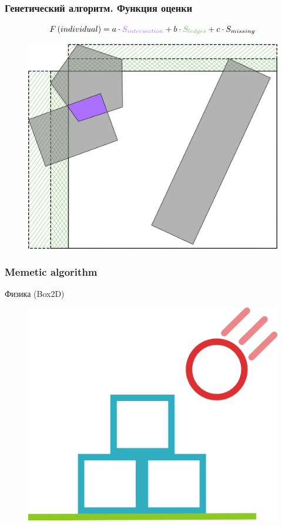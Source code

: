 \documentclass[10pt, unicode]{beamer}
\begin{document}
    \begin{frame}
        \frametitle{Генетический алгоритм. Функция оценки}
        \[
            F\left(individual\right) = a \cdot \textcolor{Intersection}{S_{intersection}} + b \cdot \textcolor{Ledges}{S_{ledges}} + c \cdot S_{missing}
        \]
        \begin{figure}[H]
            \centering
            \includegraphics[scale=0.05]{2.png}
        \end{figure}
    \end{frame}
    \begin{frame}
        \frametitle{Memetic algorithm}
        Физика (Box2D)
        \begin{figure}[H]
            \centering
            \includegraphics[scale=0.15]{box2d.png}
        \end{figure}
    \end{frame}
\end{document}
